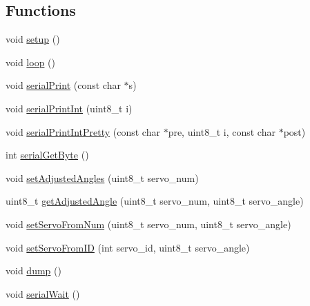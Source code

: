 \subsection*{Functions}
\begin{DoxyCompactItemize}
\item 
void \hyperlink{servo_8ino_a4fc01d736fe50cf5b977f755b675f11d}{setup} ()
\item 
void \hyperlink{servo_8ino_afe461d27b9c48d5921c00d521181f12f}{loop} ()
\item 
void \hyperlink{servo_8ino_a0f3ae8cf0248b01210907e87ad4eea85}{serial\+Print} (const char $\ast$s)
\item 
void \hyperlink{servo_8ino_a4f103414ba9a87662bcbdd19a742a9de}{serial\+Print\+Int} (uint8\+\_\+t i)
\item 
void \hyperlink{servo_8ino_a049abf2e8acf34fe1c919b25e04220c7}{serial\+Print\+Int\+Pretty} (const char $\ast$pre, uint8\+\_\+t i, const char $\ast$post)
\item 
int \hyperlink{servo_8ino_a06d585a91d5f5e628f8a8b36b026e1a3}{serial\+Get\+Byte} ()
\item 
void \hyperlink{servo_8ino_a4c944167f0f7eab9551650a150631cc6}{set\+Adjusted\+Angles} (uint8\+\_\+t servo\+\_\+num)
\item 
uint8\+\_\+t \hyperlink{servo_8ino_a20d430b6239d882e0f977aba9147454b}{get\+Adjusted\+Angle} (uint8\+\_\+t servo\+\_\+num, uint8\+\_\+t servo\+\_\+angle)
\item 
void \hyperlink{servo_8ino_ac3c8cef5edd5074a8219f281c192462f}{set\+Servo\+From\+Num} (uint8\+\_\+t servo\+\_\+num, uint8\+\_\+t servo\+\_\+angle)
\item 
void \hyperlink{servo_8ino_a3a39af320e5158e45d76e498553daa1c}{set\+Servo\+From\+I\+D} (int servo\+\_\+id, uint8\+\_\+t servo\+\_\+angle)
\item 
void \hyperlink{servo_8ino_accd2600060dbaee3a3b41aed4034c63c}{dump} ()
\item 
void \hyperlink{servo_8ino_a9cfb336c355574cb26d524cb65a4a7ec}{serial\+Wait} ()
\end{DoxyCompactItemize}
